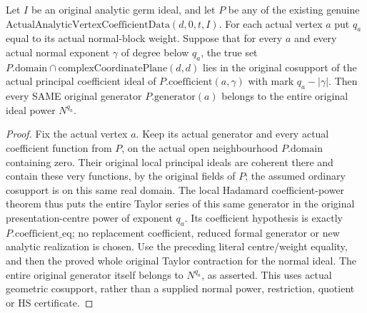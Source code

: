 \begin{theorem}
\label{hir:actual-vertex-coefficient-cosupport-same-generator-normal-power}
Let $I$ be an original analytic germ ideal, and let $P$ be any of the
existing genuine $\mathrm{ActualAnalyticVertexCoefficientData}(d,0,t,I)$.
For each actual vertex $a$ put $q_a$ equal to its actual normal-block
weight. Suppose that for every $a$ and every actual normal exponent
$\gamma$ of degree below $q_a$, the true set
$P.\mathrm{domain}\cap\mathrm{complexCoordinatePlane}(d,d)$ lies in
the original cosupport of the actual principal coefficient ideal
of $P.\mathrm{coefficient}(a,\gamma)$ with mark $q_a-|\gamma|$.
Then every SAME original generator $P.\mathrm{generator}(a)$ belongs
to the entire original ideal power $N^{q_a}$.
\leanok
\end{theorem}
\begin{proof}
Fix the actual vertex $a$. Keep its actual generator and every actual
coefficient function from $P$, on the actual open neighbourhood
$P.\mathrm{domain}$ containing zero. Their original local principal
ideals are coherent there and contain these very functions, by the
original fields of $P$; the assumed ordinary cosupport is on this
same real domain. The local Hadamard coefficient-power theorem thus
puts the entire Taylor series of this same generator in the original
presentation-centre power of exponent $q_a$. Its coefficient hypothesis
is exactly $P.\mathrm{coefficient\_eq}$; no replacement coefficient,
reduced formal generator or new analytic realization is chosen.
Use the preceding literal centre/weight equality, and then the proved
whole original Taylor contraction for the normal ideal. The entire
original generator itself belongs to $N^{q_a}$, as asserted.
This uses actual geometric cosupport, rather than a supplied normal
power, restriction, quotient or HS certificate.
\end{proof}

